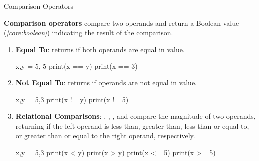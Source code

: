\documentclass[10pt]{article}
\begin{document}
    \begin{core}[label=core:comparison_operators]{Comparison Operators}

      \textbf{Comparison operators} compare two operands and return a Boolean value (\textit{\autoref{core:boolean}}) indicating the result of the comparison.

      \begin{enumerate}

      \item \textbf{Equal To}: \textcode{==} returns  if both operands are equal in value.

        \begin{pyconsole}

          x,y = 5, 5
          print(x == y)
          print(x == 3)

        \end{pyconsole}
        
        \item \textbf{Not Equal To}: \textcode{!=} returns  if operands are not equal in value.

        \begin{pyconsole}

          x,y = 5,3
          print(x != y)
          print(x != 5)

        \end{pyconsole}
        
        \item \textbf{Relational Comparisons}: \textcode{<}, \textcode{>}, \textcode{<=}, and \textcode{>=} compare the magnitude of two operands, returning  if the left operand is less than, greater than, less than or equal to, or greater than or equal to the right operand, respectively.

        \begin{pyconsole}

          x,y = 5,3
          print(x < y)
          print(x > y)
          print(x <= 5)
          print(x >= 5)

        \end{pyconsole}

      \end{enumerate}

    \end{core}
\end{document}
